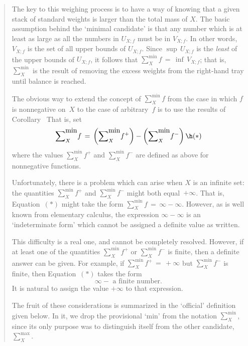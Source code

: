 \begin{quotation}
{        The key to this weighing process is to have a way of knowing that a given stack of standard weights is larger than the total mass of $X$.
    The basic assumption behind the `minimal candidate' is that any number which is at least as large as all the numbers in $U_{X;f}$ must be in $V_{X;f}$.
    In other words, $V_{X;f}$ is the set of all upper bounds of $U_{X;f}$.
    Since ${\sup}\,U_{X;f}$ is the {\em least} of the upper bounds of $U_{X;f}$, it follows that ${\sum}_{X}^{\mbox{min}} f \,=\, {\inf}\,V_{X;f}$; that is, ${\sum}_{X}^{\mbox{min}}$ is the result of removing the excess weights from the right-hand tray until balance is reached.

\V

        The obvious way to extend the concept of ${\sum}_{X}^{\mbox{min}} f$ from the case in which $f$ is nonnegative on~$X$
    to the case of arbitrary~$f$ is to use the results of Corollary~
    That is, set
        \begin{displaymath}
        {\sum}_{X}^{\mbox{min}} f \,=\,
    \left({\sum}_{X}^{\mbox{min}} f^{+}\right) - 
    \left({\sum}_{X}^{\mbox{min}} f^{-}\right) \h ({\ast})
        \end{displaymath}
    where the values ${\sum}_{X}^{\mbox{min}} f^{+}$ and ${\sum}_{X}^{\mbox{min}} f^{-}$ are defined as above for nonnegative functions.

        Unfortunately, there is a problem which can arise when $X$ is an infinite set:
    the quantities ${\sum}_{X}^{\mbox{min}} f^{+}$ and ${\sum}_{X}^{\mbox{min}} f^{-}$ might both equal~$+{\infty}$.
    That is, Equation~$({\ast})$ might take the form ${\sum}_{X}^{\mbox{min}} f \,=\, {\infty}-{\infty}$.
    However, as is  well known from elementary calculus, the expression ${\infty}-{\infty}$ is an `indeterminate form' which cannot be assigned a definite value as written.

        This difficulty is a real one, and cannot be completely resolved. However, if at least one of the quantities ${\sum}_{X}^{\mbox{min}} f^{+}$ or ${\sum}_{X}^{\mbox{min}} f^{-}$ is finite,
    then a definite answer can be given.
    For example, if ${\sum}_{X}^{\mbox{min}} f^{+} \,=\, +{\infty}$ but ${\sum}_{X}^{\mbox{min}} f^{-}$ is finite,
    then Equation~$({\ast})$ takes the form
        \begin{displaymath}
        {\infty} - \mbox{ a finite number}.
        \end{displaymath}
    It is natural to assign the value $+{\infty}$ to that expression.

\V

        The fruit of these considerations is summarized in the `official' definition given below.
    In it, we drop the provisional `min' from the notation $\sum_{X}^{\mbox{min}}$,
    since its only purpose was to distinguish itself from the other candidate, $\sum_{X}^{\mbox{max}}$.
}%
\end{quotation}

